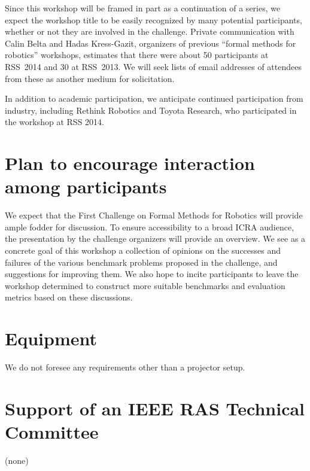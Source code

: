 \documentclass{amsart}
\begin{document}
Since this workshop will be framed in part as a continuation of a series, we
expect the workshop title to be easily recognized by many potential
participants, whether or not they are involved in the challenge.  Private
communication with Calin Belta and Hadas Kress-Gazit, organizers of previous ``formal
methods for robotics'' workshops, estimates that there were about 50 participants at
RSS~2014 and 30 at RSS~2013.  We will seek lists of email addresses of attendees
from these as another medium for solicitation.

In addition to academic participation, we anticipate continued participation from industry, including Rethink Robotics and Toyota Research, who participated in the workshop at RSS 2014. 


\section{Plan to encourage interaction among participants}
We expect that the First Challenge on Formal Methods for Robotics will provide ample fodder for discussion.  To ensure accessibility to a broad ICRA audience, the presentation by the challenge organizers will provide an overview.  We see as a concrete goal of this workshop a collection of opinions on the successes and failures of the various benchmark problems proposed in the challenge, and suggestions for improving them. We also hope to incite participants to leave the workshop determined to construct more suitable benchmarks and evaluation metrics based on these discussions.



\section{Equipment}
We do not foresee any requirements other than a projector setup.

\section{Support of an IEEE RAS Technical Committee}

(none)
\end{document}
